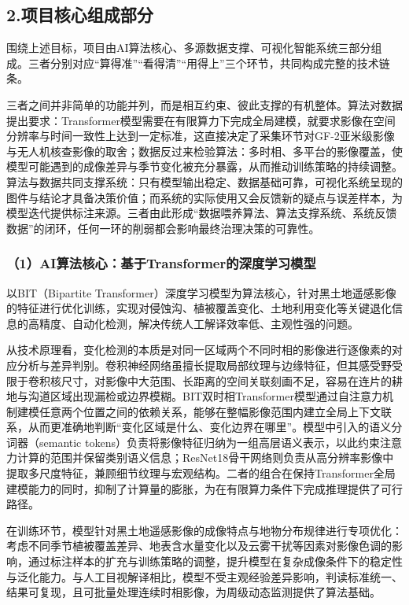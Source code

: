 \subsection{2.项目核心组成部分}

围绕上述目标，项目由AI算法核心、多源数据支撑、可视化智能系统三部分组成。三者分别对应“算得准”“看得清”“用得上”三个环节，共同构成完整的技术链条。

三者之间并非简单的功能并列，而是相互约束、彼此支撑的有机整体。算法对数据提出要求：Transformer模型需要在有限算力下完成全局建模，就要求影像在空间分辨率与时间一致性上达到一定标准，这直接决定了采集环节对GF-2亚米级影像与无人机核查影像的取舍；数据反过来检验算法：多时相、多平台的影像覆盖，使模型可能遇到的成像差异与季节变化被充分暴露，从而推动训练策略的持续调整。算法与数据共同支撑系统：只有模型输出稳定、数据基础可靠，可视化系统呈现的图件与结论才具备决策价值；而系统的实际使用又会反馈新的疑点与误差样本，为模型迭代提供标注来源。三者由此形成“数据喂养算法、算法支撑系统、系统反馈数据”的闭环，任何一环的削弱都会影响最终治理决策的可靠性。

\subsubsection{（1）AI算法核心：基于Transformer的深度学习模型}

以BIT（Bipartite Transformer）深度学习模型为算法核心，针对黑土地遥感影像的特征进行优化训练，实现对侵蚀沟、植被覆盖变化、土地利用变化等关键退化信息的高精度、自动化检测，解决传统人工解译效率低、主观性强的问题。

从技术原理看，变化检测的本质是对同一区域两个不同时相的影像进行逐像素的对应分析与差异判别。卷积神经网络虽擅长提取局部纹理与边缘特征，但其感受野受限于卷积核尺寸，对影像中大范围、长距离的空间关联刻画不足，容易在连片的耕地与沟道区域出现漏检或边界模糊。BIT双时相Transformer模型\cite{ref1}通过自注意力机制建模任意两个位置之间的依赖关系，能够在整幅影像范围内建立全局上下文联系，从而更准确地判断“变化区域是什么、变化边界在哪里”。模型中引入的语义分词器（semantic tokens）负责将影像特征归纳为一组高层语义表示，以此约束注意力计算的范围并保留类别语义信息；ResNet18骨干网络则负责从高分辨率影像中提取多尺度特征，兼顾细节纹理与宏观结构。二者的组合在保持Transformer全局建模能力的同时，抑制了计算量的膨胀，为在有限算力条件下完成推理提供了可行路径。

在训练环节，模型针对黑土地遥感影像的成像特点与地物分布规律进行专项优化：考虑不同季节植被覆盖差异、地表含水量变化以及云雾干扰等因素对影像色调的影响，通过标注样本的扩充与训练策略的调整，提升模型在复杂成像条件下的稳定性与泛化能力。与人工目视解译相比，模型不受主观经验差异影响，判读标准统一、结果可复现，且可批量处理连续时相影像，为周级动态监测提供了算法基础。

